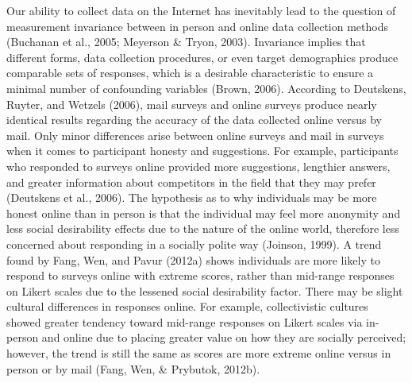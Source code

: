 \documentclass[english,man, mask]{apa6}
\theoremstyle{definition}
\theoremstyle{definition}
\theoremstyle{definition}
\theoremstyle{remark}
\begin{document}
Our ability to collect data on the Internet has inevitably lead to the
question of measurement invariance between in person and online data
collection methods (Buchanan et al., 2005; Meyerson \& Tryon, 2003).
Invariance implies that different forms, data collection procedures, or
even target demographics produce comparable sets of responses, which is
a desirable characteristic to ensure a minimal number of confounding
variables (Brown, 2006). According to Deutskens, Ruyter, and Wetzels
(2006), mail surveys and online surveys produce nearly identical results
regarding the accuracy of the data collected online versus by mail. Only
minor differences arise between online surveys and mail in surveys when
it comes to participant honesty and suggestions. For example,
participants who responded to surveys online provided more suggestions,
lengthier answers, and greater information about competitors in the
field that they may prefer (Deutskens et al., 2006). The hypothesis as
to why individuals may be more honest online than in person is that the
individual may feel more anonymity and less social desirability effects
due to the nature of the online world, therefore less concerned about
responding in a socially polite way (Joinson, 1999). A trend found by
Fang, Wen, and Pavur (2012a) shows individuals are more likely to
respond to surveys online with extreme scores, rather than mid-range
responses on Likert scales due to the lessened social desirability
factor. There may be slight cultural differences in responses online.
For example, collectivistic cultures showed greater tendency toward
mid-range responses on Likert scales via in-person and online due to
placing greater value on how they are socially perceived; however, the
trend is still the same as scores are more extreme online versus in
person or by mail (Fang, Wen, \& Prybutok, 2012b).
\end{document}
